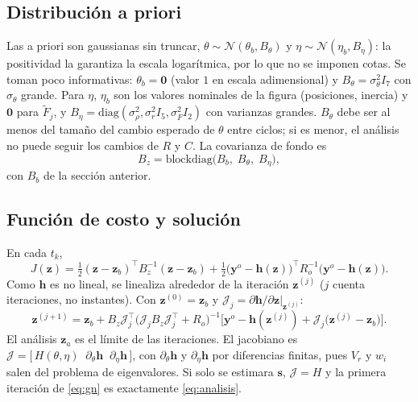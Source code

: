 \subsection{Distribución a priori}

Las a priori son gaussianas sin truncar, $\theta\sim\mathcal N(\theta_b,B_\theta)$ y $\eta\sim\mathcal N(\eta_b,B_\eta)$: la positividad la garantiza la escala logarítmica, por lo que no se imponen cotas. Se toman poco informativas: $\theta_b=\mathbf 0$ (valor $1$ en escala adimensional) y $B_\theta=\sigma_\theta^2I_7$ con $\sigma_\theta$ grande. Para $\eta$, $\eta_b$ son los valores nominales de la figura (posiciones, inercia) y $\mathbf 0$ para $\tilde F_j$, y $B_\eta=\mathrm{diag}(\sigma_\rho^2,\sigma_r^2I_5,\sigma_F^2I_2)$ con varianzas grandes. $B_\theta$ debe ser al menos del tamaño del cambio esperado de $\theta$ entre ciclos; si es menor, el análisis no puede seguir los cambios de $R$ y $C$. La covarianza de fondo es
\[
B_z=\mathrm{blockdiag}\big(B_b,\;B_\theta,\;B_\eta\big),
\]
con $B_b$ de la sección anterior.

\subsection{Función de costo y solución}

En cada $t_k$,
\[
J(\mathbf z)=\tfrac12(\mathbf z-\mathbf z_b)^\top B_z^{-1}(\mathbf z-\mathbf z_b)
+\tfrac12\big(\mathbf y^o-\mathbf h(\mathbf z)\big)^\top R_o^{-1}\big(\mathbf y^o-\mathbf h(\mathbf z)\big).
\]
Como $\mathbf h$ es no lineal, se linealiza alrededor de la iteración $\mathbf z^{(j)}$ ($j$ cuenta iteraciones, no instantes). Con $\mathbf z^{(0)}=\mathbf z_b$ y $\mathcal J_j=\partial\mathbf h/\partial\mathbf z\big|_{\mathbf z^{(j)}}$:
\begin{equation}\label{eq:gn}
\mathbf z^{(j+1)}=\mathbf z_b+B_z\mathcal J_j^\top\big(\mathcal J_jB_z\mathcal J_j^\top+R_o\big)^{-1}
\Big[\mathbf y^o-\mathbf h(\mathbf z^{(j)})+\mathcal J_j\big(\mathbf z^{(j)}-\mathbf z_b\big)\Big].
\end{equation}
El análisis $\mathbf z_a$ es el límite de las iteraciones. El jacobiano es $\mathcal J=\big[\,H(\theta,\eta)\;\;\partial_\theta\mathbf h\;\;\partial_\eta\mathbf h\,\big]$, con $\partial_\theta\mathbf h$ y $\partial_\eta\mathbf h$ por diferencias finitas, pues $V_r$ y $w_i$ salen del problema de eigenvalores. Si solo se estimara $\mathbf s$, $\mathcal J=H$ y la primera iteración de \eqref{eq:gn} es exactamente \eqref{eq:analisis}.

